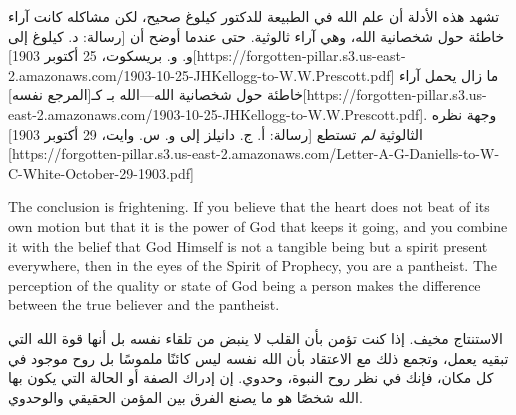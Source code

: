 تشهد هذه الأدلة أن علم الله في الطبيعة للدكتور كيلوغ صحيح، لكن مشاكله كانت آراء خاطئة حول شخصانية الله، وهي آراء ثالوثية. حتى عندما أوضح أن [رسالة: د. كيلوغ إلى و. و. بريسكوت، 25 أكتوبر 1903][https://forgotten-pillar.s3.us-east-2.amazonaws.com/1903-10-25-JHKellogg-to-W.W.Prescott.pdf] ما زال يحمل آراء خاطئة حول شخصانية الله—الله بـ كـ[المرجع نفسه][https://forgotten-pillar.s3.us-east-2.amazonaws.com/1903-10-25-JHKellogg-to-W.W.Prescott.pdf]. وجهة نظره الثالوثية \textit{لم} تستطع [رسالة: أ. ج. دانيلز إلى و. س. وايت، 29 أكتوبر 1903][https://forgotten-pillar.s3.us-east-2.amazonaws.com/Letter-A-G-Daniells-to-W-C-White-October-29-1903.pdf]


The conclusion is frightening. If you believe that the heart does not beat of its own motion but that it is the power of God that keeps it going, and you combine it with the belief that God Himself is not a tangible being but a spirit present everywhere, then in the eyes of the Spirit of Prophecy, you are a pantheist. The perception of the quality or state of God being a person makes the difference between the true believer and the pantheist.


الاستنتاج مخيف. إذا كنت تؤمن بأن القلب لا ينبض من تلقاء نفسه بل أنها قوة الله التي تبقيه يعمل، وتجمع ذلك مع الاعتقاد بأن الله نفسه ليس كائنًا ملموسًا بل روح موجود في كل مكان، فإنك في نظر روح النبوة، وحدوي. إن إدراك الصفة أو الحالة التي يكون بها الله شخصًا هو ما يصنع الفرق بين المؤمن الحقيقي والوحدوي.


